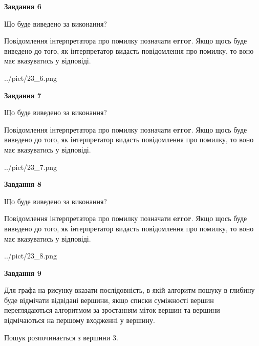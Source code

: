 \documentclass[12pt, ukrainian]{article}
\begin{document}
{\begin {large}
{\begin {center}\textbf{Завдання 6}\end {center}}\par
Що буде виведено за виконання?

Повідомлення інтерпретатора про помилку позначати \textbf{error}.
Якщо щось буде виведено до того, як інтерпретатор видасть повідомлення про помилку, 
то воно має вказуватись у відповіді. \par


\begin{center}
	{../pict/23_6.png}
\end{center}
\newpage

{\begin {center}\textbf{Завдання 7}\end {center}}\par
Що буде виведено за виконання?

Повідомлення інтерпретатора про помилку позначати \textbf{error}.
Якщо щось буде виведено до того, як інтерпретатор видасть повідомлення про помилку, 
то воно має вказуватись у відповіді. \par


\begin{center}
	{../pict/23_7.png}
\end{center}
\newpage

{\begin {center}\textbf{Завдання 8}\end {center}}\par
Що буде виведено за виконання?

Повідомлення інтерпретатора про помилку позначати \textbf{error}.
Якщо щось буде виведено до того, як інтерпретатор видасть повідомлення про помилку, 
то воно має вказуватись у відповіді. \par


\begin{center}
	{../pict/23_8.png}
\end{center}
\newpage

{\begin {center}\textbf{Завдання 9}\end {center}}\par
Для графа на рисунку вказати послідовність, в якій алгоритм пошуку в глибину буде відмічати відвідані вершини, якщо списки суміжності вершин переглядаються алгоритмом за зростанням міток вершин та вершини відмічаються на першому вход\-женні у вершину.\par
Пошук розпочинається з вершини 3.\par


\end{large}}
\end{document}
